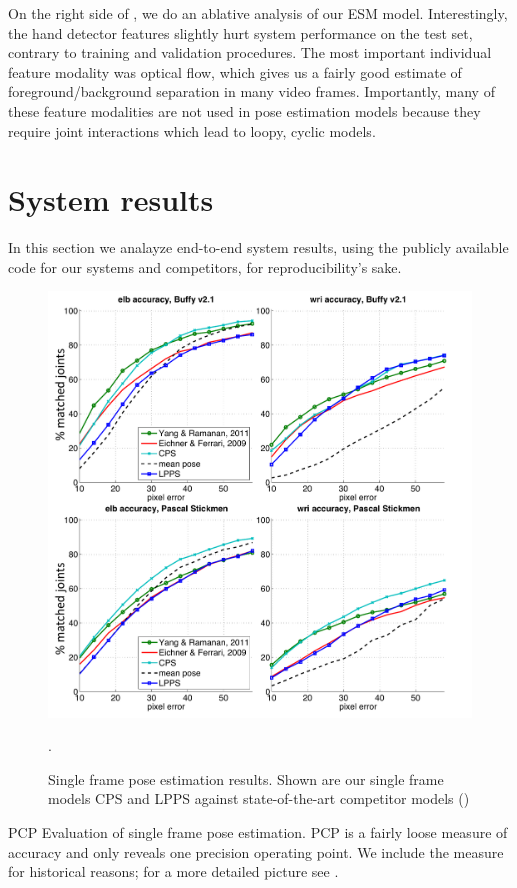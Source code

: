On the right side of , we do an ablative analysis of our ESM 
model.  Interestingly, the hand detector features slightly hurt system 
performance on the test set, contrary to training and validation procedures.  
The most important individual feature modality was optical flow, which gives us 
a fairly good estimate of foreground/background separation in many video 
frames.  Importantly, many of these feature modalities are not used in pose 
estimation models because they require joint interactions which lead to loopy, 
cyclic models.


\section{System results}
In this section we analayze end-to-end system results, using the publicly 
available code for our systems and competitors, for reproducibility's sake.
\begin{figure}[tb]
\begin{center}
\includegraphics[width=1.00\textwidth]{figs/results-buffy-pascal.pdf}
\caption[Single frame pose estimation results.]{Single frame pose estimation 
results.  Shown are our single frame models CPS and LPPS against 
state-of-the-art competitor models ()}.
\label{fig:results-buffy-pascal}
\end{center}
\end{figure}
\begin{table}[tb]
\begin{center}

\caption[PCP evaluation.]{PCP Evaluation of single frame pose estimation. PCP 
is a fairly loose measure of accuracy and only reveals one precision operating 
point.  We include the measure for historical reasons; for a more detailed 
picture see .}
\label{tab:res-table} 
\end{center}
\end{table}



